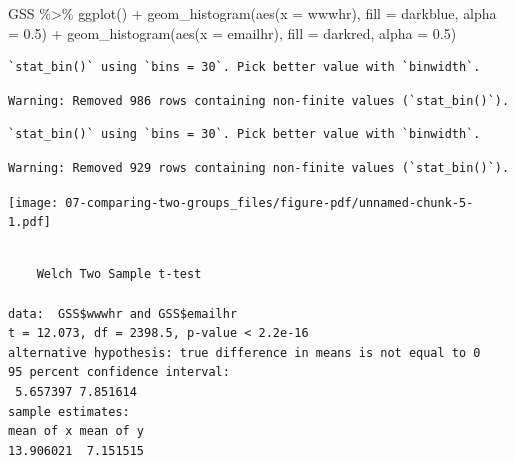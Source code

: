 \documentclass[
  letterpaper,
  DIV=11,
  numbers=noendperiod]{scrreprt}
\newenvironment{Shaded}{\begin{snugshade}}{\end{snugshade}}
\newcommand{\AttributeTok}[1]{\textcolor[rgb]{0.40,0.45,0.13}{#1}}
\newcommand{\ConstantTok}[1]{\textcolor[rgb]{0.56,0.35,0.01}{#1}}
\newcommand{\FloatTok}[1]{\textcolor[rgb]{0.68,0.00,0.00}{#1}}
\newcommand{\FunctionTok}[1]{\textcolor[rgb]{0.28,0.35,0.67}{#1}}
\newcommand{\NormalTok}[1]{\textcolor[rgb]{0.00,0.23,0.31}{#1}}
\newcommand{\SpecialCharTok}[1]{\textcolor[rgb]{0.37,0.37,0.37}{#1}}
\newcommand{\StringTok}[1]{\textcolor[rgb]{0.13,0.47,0.30}{#1}}
\begin{document}
\begin{Shaded}
\begin{Highlighting}[]
\NormalTok{GSS }\SpecialCharTok{\%\textgreater{}\%} 
  \FunctionTok{ggplot}\NormalTok{() }\SpecialCharTok{+} 
  \FunctionTok{geom\_histogram}\NormalTok{(}\FunctionTok{aes}\NormalTok{(}\AttributeTok{x =}\NormalTok{ wwwhr),   }\AttributeTok{fill =} \StringTok{\textquotesingle{}darkblue\textquotesingle{}}\NormalTok{, }\AttributeTok{alpha =} \FloatTok{0.5}\NormalTok{) }\SpecialCharTok{+} 
  \FunctionTok{geom\_histogram}\NormalTok{(}\FunctionTok{aes}\NormalTok{(}\AttributeTok{x =}\NormalTok{ emailhr), }\AttributeTok{fill =} \StringTok{\textquotesingle{}darkred\textquotesingle{}}\NormalTok{,  }\AttributeTok{alpha =} \FloatTok{0.5}\NormalTok{)}
\end{Highlighting}
\end{Shaded}

\begin{verbatim}
`stat_bin()` using `bins = 30`. Pick better value with `binwidth`.
\end{verbatim}

\begin{verbatim}
Warning: Removed 986 rows containing non-finite values (`stat_bin()`).
\end{verbatim}

\begin{verbatim}
`stat_bin()` using `bins = 30`. Pick better value with `binwidth`.
\end{verbatim}

\begin{verbatim}
Warning: Removed 929 rows containing non-finite values (`stat_bin()`).
\end{verbatim}

\texttt{[image: 07-comparing-two-groups\_files/figure-pdf/unnamed-chunk-5-1.pdf]}

\begin{Shaded}
\end{Shaded}

\begin{verbatim}

    Welch Two Sample t-test

data:  GSS$wwwhr and GSS$emailhr
t = 12.073, df = 2398.5, p-value < 2.2e-16
alternative hypothesis: true difference in means is not equal to 0
95 percent confidence interval:
 5.657397 7.851614
sample estimates:
mean of x mean of y 
13.906021  7.151515 
\end{verbatim}
\end{document}
